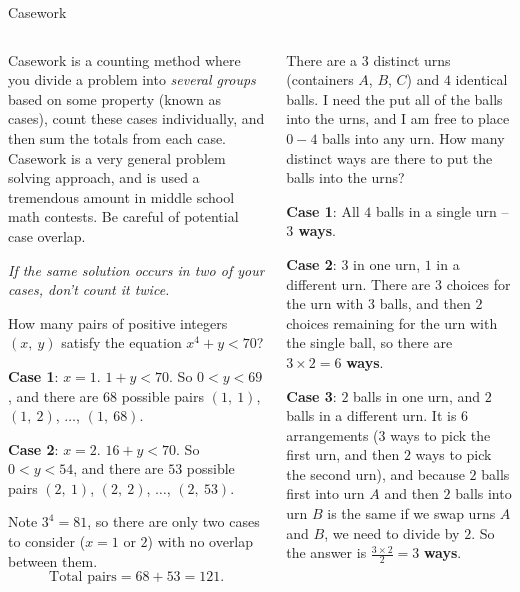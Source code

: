 \documentclass[9pt,aspectratio=169]{beamer}
\begin{document}
\begin{frame}{Casework}
  \begin{columns}[T]
    \begin{column}{0.5\textwidth}
      \begin{definition}
        Casework is a counting method where you divide a problem into \emph{several groups} based on some property (known as cases), count these cases individually, and then sum the totals from each case. Casework is a very general problem solving approach, and is used a tremendous amount in middle school math contests.  Be careful of potential case overlap. 
        
        \emph{If the same solution occurs in two of your cases, don’t count it twice.}
      \end{definition}
      \small
      \begin{problem}
        How many pairs of positive integers $(x,\ y)$ satisfy the equation $x^4 + y < 70$?
      \end{problem}
      \textbf{Case 1}: $x = 1$.  $1 + y < 70$.  So $0 < y < 69$, and there are $68$ possible pairs $(1,\ 1)$, $(1,\ 2)$, $\ldots$, $(1,\ 68)$.
      
      \textbf{Case 2}: $x = 2$.  $16 + y < 70$.  So $0 < y < 54$, and there are $53$ possible pairs $(2,\ 1)$, $(2,\ 2)$, $\ldots$, $(2,\ 53)$.

      Note $3^4 = 81$, so there are only two cases to consider ($x = 1 \text{ or } 2$) with no overlap between them.
      \[ \text{Total pairs} = 68 + 53 = 121. \]
    \end{column}
    \begin{column}{0.5\textwidth}
      \small
      \begin{problem}
        There are a $3$ distinct urns (containers $A$, $B$, $C$) and $4$ identical balls.  I need the put all of the balls into the urns, and I am free to place $0-4$ balls into any urn.  How many distinct ways are there to put the balls into the urns?
      \end{problem}
      \textbf{Case 1}:  All $4$ balls in a single urn -- \textbf{$3$ ways}.
      
      \textbf{Case 2}: $3$ in one urn, $1$ in a different urn.  There are $3$ choices for the urn with $3$ balls, and then $2$ choices remaining for the urn with the single ball, so there are $3 \times 2 = 6$ \textbf{ways}.
      
      \textbf{Case 3}: $2$ balls in one urn, and $2$ balls in a different urn.  It is $6$ arrangements ($3$ ways to pick the first urn, and then $2$ ways to pick the second urn), and because $2$ balls first into urn $A$ and then $2$ balls into urn $B$ is the same if we swap urns $A$ and $B$, we need to divide by $2$. So the answer is $\frac{3 \times 2}{2} = 3$ \textbf{ways}.
      

\end{column}
\end{columns}
\end{frame}
\end{document}
